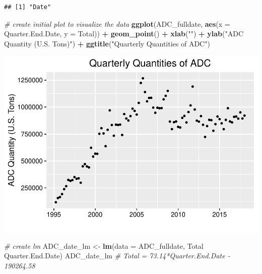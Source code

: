 \documentclass[12pt,]{article}
\newenvironment{Shaded}{\begin{snugshade}}{\end{snugshade}}
\newcommand{\KeywordTok}[1]{\textcolor[rgb]{0.13,0.29,0.53}{\textbf{#1}}}
\newcommand{\DataTypeTok}[1]{\textcolor[rgb]{0.13,0.29,0.53}{#1}}
\newcommand{\StringTok}[1]{\textcolor[rgb]{0.31,0.60,0.02}{#1}}
\newcommand{\CommentTok}[1]{\textcolor[rgb]{0.56,0.35,0.01}{\textit{#1}}}
\newcommand{\OperatorTok}[1]{\textcolor[rgb]{0.81,0.36,0.00}{\textbf{#1}}}
\newcommand{\NormalTok}[1]{#1}
\begin{document}
\begin{verbatim}
## [1] "Date"
\end{verbatim}

\begin{Shaded}
\begin{Highlighting}[]
\CommentTok{# create initial plot to visualize the data}
\KeywordTok{ggplot}\NormalTok{(ADC_fulldate, }\KeywordTok{aes}\NormalTok{(}\DataTypeTok{x =}\NormalTok{ Quarter.End.Date, }\DataTypeTok{y =}\NormalTok{ Total)) }\OperatorTok{+}
\StringTok{  }\KeywordTok{geom_point}\NormalTok{() }\OperatorTok{+}\StringTok{ }
\StringTok{  }\KeywordTok{xlab}\NormalTok{(}\StringTok{""}\NormalTok{) }\OperatorTok{+}\StringTok{ }
\StringTok{  }\KeywordTok{ylab}\NormalTok{(}\StringTok{"ADC Quantity (U.S. Tons)"}\NormalTok{) }\OperatorTok{+}
\StringTok{  }\KeywordTok{ggtitle}\NormalTok{(}\StringTok{"Quarterly Quantities of ADC"}\NormalTok{)}
\end{Highlighting}
\end{Shaded}

\includegraphics{SKo_Project_Template_files/figure-latex/Test2_1-1.pdf}

\begin{Shaded}
\begin{Highlighting}[]
\CommentTok{# create lm}
\NormalTok{ADC_date_lm <-}\StringTok{ }\KeywordTok{lm}\NormalTok{(}\DataTypeTok{data =}\NormalTok{ ADC_fulldate, Total }\OperatorTok{~}\StringTok{ }\NormalTok{Quarter.End.Date)}
\NormalTok{ADC_date_lm }\CommentTok{# Total = 73.14*Quarter.End.Date - 190264.58}
\end{Highlighting}
\end{Shaded}
\end{document}
